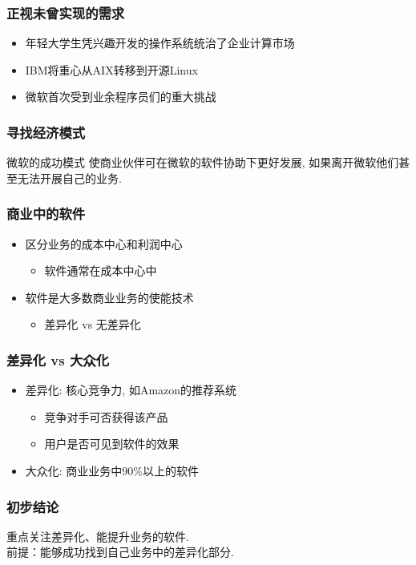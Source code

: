 \documentclass{beamer}
\begin{document}
\begin{frame}
	\frametitle{正视未曾实现的需求}
	\begin{itemize}
		\item 年轻大学生凭兴趣开发的操作系统统治了企业计算市场
		\item IBM将重心从AIX转移到开源Linux
		\item 微软首次受到业余程序员们的重大挑战
	\end{itemize}
\end{frame}

\begin{frame}
	\frametitle{寻找经济模式}
	\begin{block}{微软的成功模式}
	使商业伙伴可在微软的软件协助下更好发展, 如果离开微软他们甚至无法开展自己的业务.
	\end{block}
\end{frame}

\begin{frame}
	\frametitle{商业中的软件}
	\begin{itemize}
		\item 区分业务的成本中心和利润中心
			\begin{itemize}
				\item 软件通常在成本中心中
			\end{itemize}
		\item 软件是大多数商业业务的使能技术
			\begin{itemize}
				\item 差异化 vs 无差异化
			\end{itemize}
	\end{itemize}
\end{frame}

\begin{frame}
	\frametitle{差异化 vs 大众化}
	\begin{itemize}
		\item 差异化: 核心竞争力, 如Amazon的推荐系统
			\begin{itemize}
				\item 竞争对手可否获得该产品
				\item 用户是否可见到软件的效果
			\end{itemize}
		\item 大众化: 商业业务中90\%以上的软件
	\end{itemize}
\end{frame}

\begin{frame}
	\frametitle{初步结论}
	重点关注差异化、能提升业务的软件. \\
	前提：能够成功找到自己业务中的差异化部分.
\end{frame}
\end{document}
